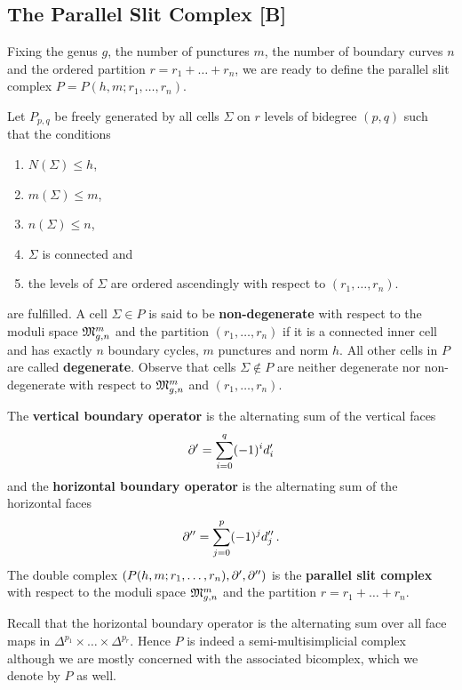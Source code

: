 \subsection{The Parallel Slit Complex [B]}
\label{cellular_models:parallel:bicomplex}
Fixing the genus $g$, the number of punctures $m$, the number of boundary curves $n$ and the ordered partition $r = r_1 + \ldots + r_n$,
we are ready to define the parallel slit complex $P = P(h,m;r_1, \ldots, r_n)$.

\begin{defi}
\label{cellular_models:parallel:parallel_slit_complex}
Let $P_{p,q}$ be freely generated by all cells $\Sigma$ on $r$ levels of bidegree $(p,q)$ such that the conditions
\begin{enumerate}
    \item $N(\Sigma) \le h$,
    \item $m(\Sigma) \le m$,
    \item $n(\Sigma) \le n$,
    \item $\Sigma$ is connected and
    \item the levels of $\Sigma$ are ordered ascendingly with respect to $(r_1, \ldots, r_n)$.
\end{enumerate}
are fulfilled.
A cell $\Sigma \in P$ is said to be {\bf non-degenerate} with respect to the moduli space $\Modspc[n]$ and the partition $(r_1, \ldots, r_n)$
if it is a connected inner cell and has exactly $n$ boundary cycles, $m$ punctures and norm $h$.
All other cells in $P$ are called {\bf degenerate}.
Observe that cells $\Sigma \notin P$ are neither degenerate nor non-degenerate with respect to $\Modspc[n]$ and $(r_1, \ldots, r_n)$.

The {\bf vertical boundary operator} is the alternating sum of the vertical faces
\[
    \del' = \sum_{i=0}^{q}(-1)^i d'_i
\]
and the {\bf horizontal boundary operator} is the alternating sum of the horizontal faces
\[
    \del'' = \sum_{j=0}^{p}(-1)^j d''_j \,.
\]
The double complex $(P(h,m;r_1, \ldots, r_n), \del', \del'')$ is the {\bf parallel slit complex} with respect to the moduli space $\Modspc[n]$ and the partition $r = r_1 + \ldots + r_n$.
\end{defi}

\begin{rem}
Recall that the horizontal boundary operator is the alternating sum over all face maps in $\Delta^{p_1} \times \ldots \times \Delta^{p_r}$.
Hence $P$ is indeed a semi-multisimplicial complex although we are mostly concerned with the associated bicomplex, which we denote by $P$ as well.
\end{rem}

